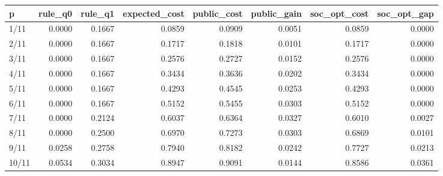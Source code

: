 \begin{tabular}{lrrrrrrr}
\toprule
p & rule\_q0 & rule\_q1 & expected\_cost & public\_cost & public\_gain & soc\_opt\_cost & soc\_opt\_gap \\
\midrule
1/11 & 0.0000 & 0.1667 & 0.0859 & 0.0909 & 0.0051 & 0.0859 & 0.0000 \\
2/11 & 0.0000 & 0.1667 & 0.1717 & 0.1818 & 0.0101 & 0.1717 & 0.0000 \\
3/11 & 0.0000 & 0.1667 & 0.2576 & 0.2727 & 0.0152 & 0.2576 & 0.0000 \\
4/11 & 0.0000 & 0.1667 & 0.3434 & 0.3636 & 0.0202 & 0.3434 & 0.0000 \\
5/11 & 0.0000 & 0.1667 & 0.4293 & 0.4545 & 0.0253 & 0.4293 & 0.0000 \\
6/11 & 0.0000 & 0.1667 & 0.5152 & 0.5455 & 0.0303 & 0.5152 & 0.0000 \\
7/11 & 0.0000 & 0.2124 & 0.6037 & 0.6364 & 0.0327 & 0.6010 & 0.0027 \\
8/11 & 0.0000 & 0.2500 & 0.6970 & 0.7273 & 0.0303 & 0.6869 & 0.0101 \\
9/11 & 0.0258 & 0.2758 & 0.7940 & 0.8182 & 0.0242 & 0.7727 & 0.0213 \\
10/11 & 0.0534 & 0.3034 & 0.8947 & 0.9091 & 0.0144 & 0.8586 & 0.0361 \\
\bottomrule
\end{tabular}
